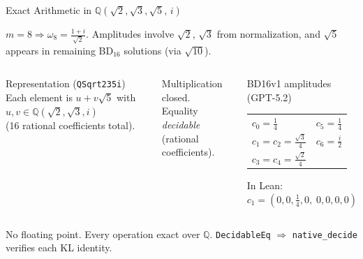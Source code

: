\documentclass[aspectratio=169,t]{beamer}
\newcommand{\QQ}{\mathbb{Q}}
\newcommand{\code}[1]{\texttt{\small #1}}
\newcommand{\chk}{\textcolor{Sage}{\checkmark}}
\begin{document}
\begin{frame}{Exact Arithmetic in $\QQ(\sqrt{2},\sqrt{3},\sqrt{5},\,i)$}

$m{=}8 \Rightarrow \omega_8 = \tfrac{1+i}{\sqrt{2}}$.\;
Amplitudes involve $\sqrt{2}$, $\sqrt{3}$ from normalization,
and $\sqrt{5}$ appears in remaining BD$_{16}$ solutions (via $\sqrt{10}$).

\begin{columns}[T]
\begin{block}{Representation (\code{QSqrt235i})}
Each element is $u + v\sqrt{5}$ with $u,v \in \QQ(\sqrt{2},\sqrt{3},i)$\\
(16 rational coefficients total).
\end{block}

Multiplication closed.\\
Equality \emph{decidable} (rational coefficients).

\begin{exampleblock}{BD16v1 amplitudes (GPT-5.2)}
{\small
\begin{tabular}{@{}ll@{}}
$c_0 {=} \tfrac{1}{4}$ & $c_5 {=} \tfrac{1}{4}$\\[2pt]
$c_1 {=} c_2 {=} \tfrac{\sqrt{3}}{4}$ & $c_6 {=} \tfrac{i}{2}$\\[2pt]
$c_3 {=} c_4 {=} \tfrac{\sqrt{2}}{4}$\\
\end{tabular}
}

In Lean: $c_1 = (0,0,\tfrac{1}{4},0,\;0,0,0,0)$\;\chk
\end{exampleblock}
\end{columns}

\vspace{0.2em}
\textcolor{Slate}{\small No floating point.  Every operation exact over $\QQ$.
\code{DecidableEq} $\Rightarrow$ \code{native\_decide} verifies each KL identity.}
\end{frame}
\end{document}
